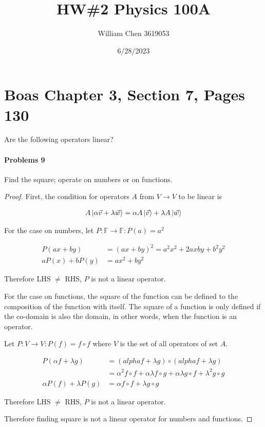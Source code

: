 \documentclass{article}
\title{HW\#2 Physics 100A}
\date{6/28/2023}
\author{William Chen 3619053}
\begin{document}
\maketitle
 
\section*{Boas Chapter 3, Section 7, Pages 130} 
 
Are the following operators linear? 
 
\paragraph{Problems 9}  Find the square; operate on numbers or on functions.

\begin{proof}
First, the condition for operators $A$ from $V \to V$ to be linear is

\begin{align*}
A \ket{ \alpha \vec{v} + \lambda \vec{w}} = \alpha A \ket{\vec{v}} + \lambda A \ket{ \vec{w}}
\end{align*}

For the case on numbers, let $P : \mathbb{F} \to \mathbb{F} : P(a) = a^2$

\begin{align*}
P(ax + by) &= (ax + by)^2 = a^2 x^2 + 2axby + b^2 y^2 \\
aP(x) + bP(y) &= ax^2 + by^2
\end{align*}

Therefore LHS $\neq$ RHS, $P$ is not a linear operator.

For the case on functions, the square of the function can be defined to the composition of the function with itself. The square of a function is only defined if the co-domain is also the domain, in other words, when the function is an operator.

Let $P: V \to V: P(f) = f \circ f$ where $V$ is the set of all operators of set $A$.

\begin{align*}
P(\alpha f + \lambda g) &= (alpha f + \lambda g) \circ (alpha f + \lambda g) 
\\ &= \alpha^2 f \circ f + \alpha \lambda f \circ g + \alpha \lambda g \circ f + \lambda^2 g \circ g\\
\alpha P(f) + \lambda P(g) &= \alpha f \circ f + \lambda g \circ g
\end{align*}
 
Therefore LHS $\neq$ RHS, $P$ is not a linear operator.

Therefore finding square is not a linear operator for numbers and functions.

\end{proof}
\end{document}
